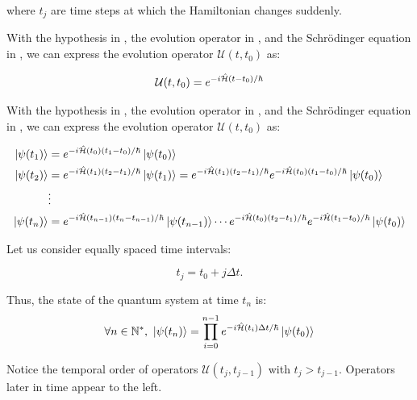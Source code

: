 where \( t_j \) are time steps at which the Hamiltonian changes suddenly.

With the hypothesis in , the evolution operator in , 
and the Schrödinger equation in , we can express the evolution operator \( \mathcal{U}(t, t_0) \) as:


\begin{equation}
    \mathcal{U}(t,t_0) = e^{-i \hat{\mathcal{H}} (t-t_0)/\hbar}
\end{equation}



With the hypothesis in , the evolution operator in , and the 
Schrödinger equation in , we can express the evolution operator \( \mathcal{U}(t, t_0) \) as:

\begin{align*}
    \ket{\psi(t_1)} &= e^{-i \hat{\mathcal{H}} (t_0) (t_1-t_0)/\hbar} \ket{\psi(t_0)} \\
    \ket{\psi(t_2)} &= e^{-i \hat{\mathcal{H}} (t_1) (t_2-t_1)/\hbar} \ket{\psi(t_1)} =  e^{-i \hat{\mathcal{H}}(t_1) (t_2-t_1)/\hbar} 
    e^{-i \hat{\mathcal{H}}(t_0) (t_1-t_0)/\hbar} \ket{\psi(t_0)}\\
    &\vdots \\
    \ket{\psi(t_n)} &= e^{-i \hat{\mathcal{H}}(t_{n-1}) (t_n-t_{n-1})/\hbar} \ket{\psi(t_{n-1})} \cdots  e^{-i \hat{\mathcal{H}}(t_{0}) (t_2-t_1)/\hbar} 
    e^{-i \hat{\mathcal{H}} (t_1-t_0)/\hbar} \ket{\psi(t_0)}
\end{align*}

Let us consider equally spaced time intervals:

\[
t_j = t_0 + j \Delta t.
\]

Thus, the state of the quantum system at time \( t_n \) is:
\begin{equation} \label{eq: expression state t_n}
   \forall n \in \mathbb{N}^*, \  \ket{\psi(t_n)} = \prod_{i=0}^{n-1} e^{-i \hat{\mathcal{H}}(t_{i}) \Delta t /\hbar} \ket{\psi(t_0)}
\end{equation}

Notice the temporal order of operators \( \mathcal{U}(t_j, t_{j-1}) \) with \( t_j > t_{j-1} \). Operators later in time appear to the left.


